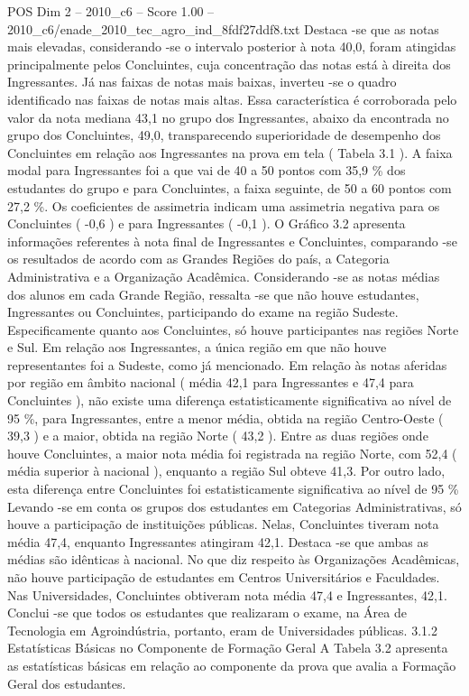 \begin{textsample}{POS Dim 2 – 2010\_c6 – Score 1.00 – 2010\_c6/enade\_2010\_tec\_agro\_ind\_8fdf27ddf8.txt}
Destaca -se que as notas mais elevadas, considerando -se o intervalo posterior à nota 40,0, foram atingidas principalmente pelos Concluintes, cuja concentração das notas está à direita dos Ingressantes.
Já nas faixas de notas mais baixas, inverteu -se o quadro identificado nas faixas de notas mais altas.
Essa característica é corroborada pelo valor da nota mediana 43,1 no grupo dos Ingressantes, abaixo da encontrada no grupo dos Concluintes, 49,0, transparecendo superioridade de desempenho dos Concluintes em relação aos Ingressantes na prova em tela ( Tabela 3.1 ).
A faixa modal para Ingressantes foi a que vai de 40 a 50 pontos com 35,9 \% dos estudantes do grupo e para Concluintes, a faixa seguinte, de 50 a 60 pontos com 27,2 \%.
Os coeficientes de assimetria indicam uma assimetria negativa para os Concluintes ( -0,6 ) e para Ingressantes ( -0,1 ).
O Gráfico 3.2 apresenta informações referentes à nota final de Ingressantes e Concluintes, comparando -se os resultados de acordo com as Grandes Regiões do país, a Categoria Administrativa e a Organização Acadêmica.
Considerando -se as notas médias dos alunos em cada Grande Região, ressalta -se que não houve estudantes, Ingressantes ou Concluintes, participando do exame na região Sudeste.
Especificamente quanto aos Concluintes, só houve participantes nas regiões Norte e Sul.
Em relação aos Ingressantes, a única região em que não houve representantes foi a Sudeste, como já mencionado.
Em relação às notas aferidas por região em âmbito nacional ( média 42,1 para Ingressantes e 47,4 para Concluintes ), não existe uma diferença estatisticamente significativa ao nível de 95 \%, para Ingressantes, entre a menor média, obtida na região Centro-Oeste ( 39,3 ) e a maior, obtida na região Norte ( 43,2 ).
Entre as duas regiões onde houve Concluintes, a maior nota média foi registrada na região Norte, com 52,4 ( média superior à nacional ), enquanto a região Sul obteve 41,3.
Por outro lado, esta diferença entre Concluintes foi estatisticamente significativa ao nível de 95 \% Levando -se em conta os grupos dos estudantes em Categorias Administrativas, só houve a participação de instituições públicas.
Nelas, Concluintes tiveram nota média 47,4, enquanto Ingressantes atingiram 42,1.
Destaca -se que ambas as médias são idênticas à nacional.
No que diz respeito às Organizações Acadêmicas, não houve participação de estudantes em Centros Universitários e Faculdades.
Nas Universidades, Concluintes obtiveram nota média 47,4 e Ingressantes, 42,1.
Conclui -se que todos os estudantes que realizaram o exame, na Área de Tecnologia em Agroindústria, portanto, eram de Universidades públicas. 3.1.2 Estatísticas Básicas no Componente de Formação Geral A Tabela 3.2 apresenta as estatísticas básicas em relação ao componente da prova que avalia a Formação Geral dos estudantes.

\end{textsample}
